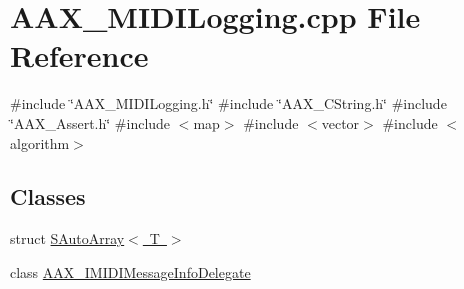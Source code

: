 \hypertarget{a00734}{}\section{A\+A\+X\+\_\+\+M\+I\+D\+I\+Logging.\+cpp File Reference}
\label{a00734}
{\ttfamily \#include \char`\"{}A\+A\+X\+\_\+\+M\+I\+D\+I\+Logging.\+h\char`\"{}}\newline
{\ttfamily \#include \char`\"{}A\+A\+X\+\_\+\+C\+String.\+h\char`\"{}}\newline
{\ttfamily \#include \char`\"{}A\+A\+X\+\_\+\+Assert.\+h\char`\"{}}\newline
{\ttfamily \#include $<$map$>$}\newline
{\ttfamily \#include $<$vector$>$}\newline
{\ttfamily \#include $<$algorithm$>$}\newline
\subsection*{Classes}
\begin{DoxyCompactItemize}
\item 
struct \mbox{\hyperlink{a01949}{S\+Auto\+Array$<$ T $>$}}
\item 
class \mbox{\hyperlink{a01953}{A\+A\+X\+\_\+\+I\+M\+I\+D\+I\+Message\+Info\+Delegate}}
\end{DoxyCompactItemize}
